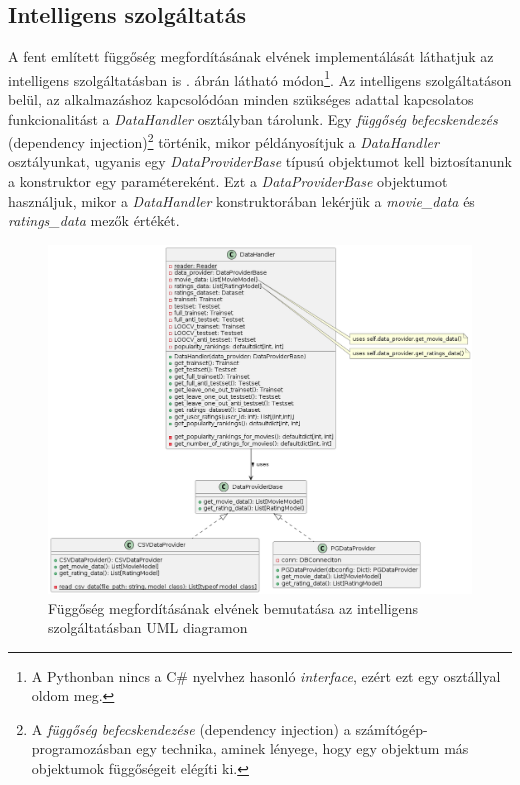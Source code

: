 \documentclass[
]{thesis-ekf}
\theoremstyle{definition}
\theoremstyle{remark}
\begin{document}
\subsection{Intelligens szolgáltatás}
A fent említett függőség megfordításának elvének implementálását láthatjuk az intelligens szolgáltatásban is . ábrán látható módon\footnote{A Pythonban nincs a C\# nyelvhez hasonló \emph{interface}, ezért ezt egy osztállyal oldom meg.}. Az intelligens szolgáltatáson belül, az alkalmazáshoz kapcsolódóan minden szükséges adattal kapcsolatos funkcionalitást a \emph{DataHandler} osztályban tárolunk. Egy \emph{függőség befecskendezés} (dependency injection)\footnote{A \emph{függőség befecskendezése} (dependency injection) a számítógép-programozásban egy technika, aminek lényege, hogy egy objektum más objektumok függőségeit elégíti ki.\cite{wiki-dependency-injection-magyar}} történik, mikor példányosítjuk a \emph{DataHandler} osztályunkat, ugyanis egy \emph{DataProviderBase} típusú objektumot kell biztosítanunk a konstruktor egy paramétereként. Ezt a \emph{DataProviderBase} objektumot használjuk, mikor a \emph{DataHandler} konstruktorában lekérjük a \emph{movie\_data} és \emph{ratings\_data} mezők értékét.

\begin{figure}[H]
	\centering
	\includegraphics[width=14cm]{images/data-manipulation-in-intelligent-service.png}
	\caption[Függőség megfordításának elvének UML diagramon való bemutatása az intelligens szolgáltatásban]{Függőség megfordításának elvének bemutatása az intelligens szolgáltatásban UML diagramon}
	\label{fig-dip-intelligent-service}
\end{figure}
\end{document}

